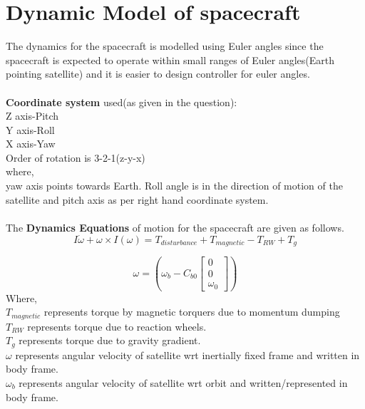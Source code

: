 \documentclass[10pt,a4paper]{report}
\begin{document}
\chapter{Dynamic Model of spacecraft}
The dynamics for the spacecraft is modelled using Euler angles since the spacecraft is expected to operate within small ranges of Euler angles(Earth pointing satellite) and it is easier to design controller for euler angles.\\ \\
\textbf{Coordinate system} used(as given in the question):\\
Z axis-Pitch\\
Y axis-Roll\\
X axis-Yaw\\
Order of rotation is 3-2-1(z-y-x)\\
where,\\
yaw axis points towards Earth. Roll angle is in the direction of motion of the satellite and pitch axis as per right hand coordinate system.
\\ \\
The \textbf{Dynamics Equations} of motion for the spacecraft are given as follows.\\
\begin{equation}
I\dot{\omega}+\omega\times I(\omega)=T_{disturbance}+T_{magnetic}-T_{RW}+T_{g}
\end{equation}

\begin{equation}
\omega=\left(\omega_{b}-C_{b0}\begin{bmatrix}
0\\0\\\omega_{0}
\end{bmatrix}\right)
\end{equation}
Where,\\
	$ T_{magnetic} $ represents torque by magnetic torquers due to momentum dumping \\
	$ T_{RW} $ represents torque due to reaction wheels.\\
	$ T_{g} $ represents torque due to gravity gradient.\\
	$ \omega $ represents angular velocity of satellite wrt inertially fixed frame and written in body frame.\\
	$ \omega_b $ represents angular velocity of satellite wrt orbit and written/represented in body frame.
\end{document}

